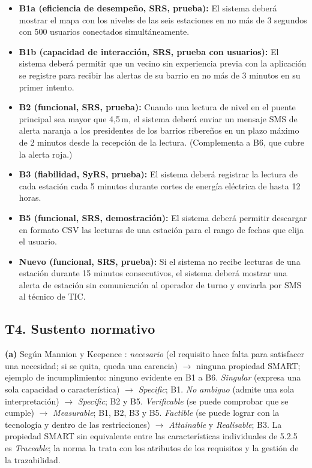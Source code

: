 \documentclass[11pt]{article}
\newcommand{\subseccion}[1]{\subsection{\textcolor{midblue}{#1}}}
\begin{document}
	\begin{itemize}[leftmargin=18pt,itemsep=3pt]
		\item \textbf{B1a (eficiencia de desempeño, SRS, prueba):} El sistema deberá mostrar el mapa con los niveles de las seis estaciones en no más de 3 segundos con 500 usuarios conectados simultáneamente.
		\item \textbf{B1b (capacidad de interacción, SRS, prueba con usuarios):} El sistema deberá permitir que un vecino sin experiencia previa con la aplicación se registre para recibir las alertas de su barrio en no más de 3 minutos en su primer intento.
		\item \textbf{B2 (funcional, SRS, prueba):} Cuando una lectura de nivel en el puente principal sea mayor que 4,5\,m, el sistema deberá enviar un mensaje SMS de alerta naranja a los presidentes de los barrios ribereños en un plazo máximo de 2 minutos desde la recepción de la lectura. (Complementa a B6, que cubre la alerta roja.)
		\item \textbf{B3 (fiabilidad, SyRS, prueba):} El sistema deberá registrar la lectura de cada estación cada 5 minutos durante cortes de energía eléctrica de hasta 12 horas.
		\item \textbf{B5 (funcional, SRS, demostración):} El sistema deberá permitir descargar en formato CSV las lecturas de una estación para el rango de fechas que elija el usuario.
		\item \textbf{Nuevo (funcional, SRS, prueba):} Si el sistema no recibe lecturas de una estación durante 15 minutos consecutivos, el sistema deberá mostrar una alerta de estación sin comunicación al operador de turno y enviarla por SMS al técnico de TIC.
	\end{itemize}
	
	\subseccion{T4. Sustento normativo}
	
	\textbf{(a)} Según Mannion y Keepence \citep{mannion_smart_1995}: \emph{necesario} (el requisito hace falta para satisfacer una necesidad; si se quita, queda una carencia) $\rightarrow$ ninguna propiedad SMART; ejemplo de incumplimiento: ninguno evidente en B1 a B6. \emph{Singular} (expresa una sola capacidad o característica) $\rightarrow$ \emph{Specific}; B1. \emph{No ambiguo} (admite una sola interpretación) $\rightarrow$ \emph{Specific}; B2 y B5. \emph{Verificable} (se puede comprobar que se cumple) $\rightarrow$ \emph{Measurable}; B1, B2, B3 y B5. \emph{Factible} (se puede lograr con la tecnología y dentro de las restricciones) $\rightarrow$ \emph{Attainable} y \emph{Realisable}; B3. La propiedad SMART sin equivalente entre las características individuales de 5.2.5 es \emph{Traceable}; la norma la trata con los atributos de los requisitos y la gestión de la trazabilidad.
	
\end{document}
